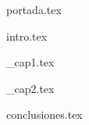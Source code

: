\documentclass[12pt, a4paper, onecolumn]{ieeeconfarq}
\begin{document}
{portada.tex}

\newpage
{}
\small
\tableofcontents
\newpage

\normalsize

{intro.tex}
\newpage

{_cap1.tex}
\newpage

{_cap2.tex}
\newpage

{conclusiones.tex}



\end{document}
